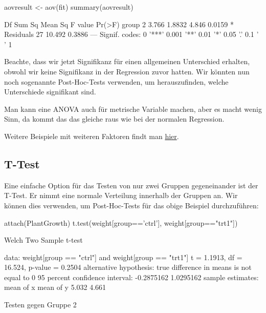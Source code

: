\documentclass[a4paper,twoside]{tufte-book}\usepackage[]{graphicx}\usepackage[]{color}
\begin{document}
\begin{appendices}
\begin{Schunk}
\begin{Sinput}
aovresult <- aov(fit)
summary(aovresult)
\end{Sinput}
\begin{Soutput}
            Df Sum Sq Mean Sq F value Pr(>F)  
group        2  3.766  1.8832   4.846 0.0159 *
Residuals   27 10.492  0.3886                 
---
Signif. codes:  0 '***' 0.001 '**' 0.01 '*' 0.05 '.' 0.1 ' ' 1
\end{Soutput}
\end{Schunk}

Beachte, dass wir jetzt Signifikanz für einen allgemeinen Unterschied erhalten, obwohl wir keine Signifikanz in der Regression zuvor hatten. Wir könnten nun noch sogenannte Post-Hoc-Tests verwenden, um herauszufinden, welche Unterschiede signifikant sind.

Man kann eine ANOVA auch für metrische Variable machen, aber es macht wenig Sinn, da kommt das das gleiche raus wie bei der normalen Regression. 

Weitere Beispiele mit weiteren Faktoren findt man \href{http://www.statmethods.net/stats/anova.html}{hier}.


\subsection{T-Test}

Eine einfache Option für das Testen von nur zwei Gruppen gegeneinander ist der T-Test. Er nimmt eine normale Verteilung innerhalb der Gruppen an. Wir können dies verwenden, um Post-Hoc-Tests für das obige Beispiel durchzuführen:

\begin{Schunk}
\begin{Sinput}
attach(PlantGrowth)
t.test(weight[group=='ctrl'], weight[group=="trt1"])
\end{Sinput}
\begin{Soutput}

	Welch Two Sample t-test

data:  weight[group == "ctrl"] and weight[group == "trt1"]
t = 1.1913, df = 16.524, p-value = 0.2504
alternative hypothesis: true difference in means is not equal to 0
95 percent confidence interval:
 -0.2875162  1.0295162
sample estimates:
mean of x mean of y 
    5.032     4.661 
\end{Soutput}
\end{Schunk}

Testen gegen Gruppe 2


\end{appendices}
\end{document}
